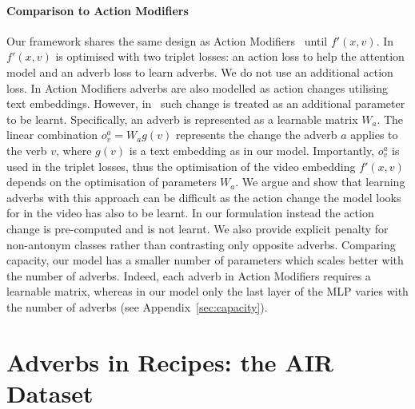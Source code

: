 \documentclass[10pt,twocolumn,letterpaper]{article}
\begin{document}
\paragraph{Comparison to Action Modifiers} Our framework shares the same design  as Action Modifiers~\cite{doughty2020action} until $f'(x, v)$. In~\cite{doughty2020action} $f'(x, v)$ is optimised with two triplet losses: an action loss to help the attention model and an adverb loss to learn adverbs. 
We do not use an additional action loss. 
In Action Modifiers adverbs are also modelled as action changes utilising text embeddings. However, in~\cite{doughty2020action} such change is treated as an additional parameter to be learnt. Specifically, an adverb is represented as a learnable matrix $W_a$. The linear combination $o_v^a = W_a g(v)$ represents the change the adverb $a$ applies to the verb $v$, where $g(v)$ is a text embedding as in our model. Importantly, $o_v^a$ is used in the triplet losses, thus the optimisation of the video embedding $f'(x, v)$ depends on the optimisation of parameters $W_a$. We argue and show that learning adverbs with this approach  
can be difficult as the action change the model looks for in the video has also to be learnt. In our formulation instead the 
action change is pre-computed and is not learnt. 
We also provide explicit penalty for non-antonym classes rather than contrasting only opposite adverbs.
Comparing capacity, our model has a smaller number of parameters which scales better with the number of adverbs. Indeed, each adverb in Action Modifiers requires a learnable matrix, whereas in our model only the last layer of the MLP varies with the number of adverbs (see Appendix~\ref{sec:capacity}). 

\vspace{-7pt}
\section{Adverbs in Recipes: the AIR Dataset}
\label{sec:our_dataset}
\end{document}
